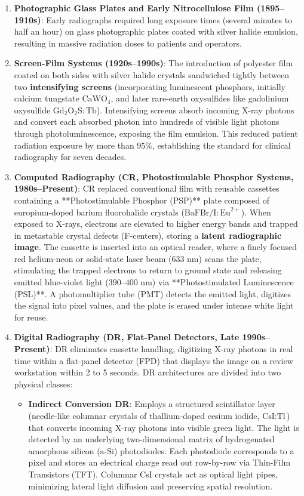 \documentclass[11pt,a4paper]{article}
\begin{document}
\begin{enumerate}[leftmargin=*]
    \item \textbf{Photographic Glass Plates and Early Nitrocellulose Film (1895--1910s)}: Early radiographs required long exposure times (several minutes to half an hour) on glass photographic plates coated with silver halide emulsion, resulting in massive radiation doses to patients and operators.
    \item \textbf{Screen-Film Systems (1920s--1990s)}: The introduction of polyester film coated on both sides with silver halide crystals sandwiched tightly between two \textbf{intensifying screens} (incorporating luminescent phosphors, initially calcium tungstate $\text{CaWO}_4$, and later rare-earth oxysulfides like gadolinium oxysulfide $\text{Gd}_2\text{O}_2\text{S}:\text{Tb}$). Intensifying screens absorb incoming X-ray photons and convert each absorbed photon into hundreds of visible light photons through photoluminescence, exposing the film emulsion. This reduced patient radiation exposure by more than $95\%$, establishing the standard for clinical radiography for seven decades.
    \item \textbf{Computed Radiography (CR, Photostimulable Phosphor Systems, 1980s--Present)}: CR replaced conventional film with reusable cassettes containing a **Photostimulable Phosphor (PSP)** plate composed of europium-doped barium fluorohalide crystals ($\text{BaFBr/I}:\text{Eu}^{2+}$). When exposed to X-rays, electrons are elevated to higher energy bands and trapped in metastable crystal defects (F-centers), storing a \textbf{latent radiographic image}. The cassette is inserted into an optical reader, where a finely focused red helium-neon or solid-state laser beam ($633\text{ nm}$) scans the plate, stimulating the trapped electrons to return to ground state and releasing emitted blue-violet light ($390\text{--}400\text{ nm}$) via **Photostimulated Luminescence (PSL)**. A photomultiplier tube (PMT) detects the emitted light, digitizes the signal into pixel values, and the plate is erased under intense white light for reuse.
    \item \textbf{Digital Radiography (DR, Flat-Panel Detectors, Late 1990s--Present)}: DR eliminates cassette handling, digitizing X-ray photons in real time within a flat-panel detector (FPD) that displays the image on a review workstation within 2 to 5 seconds. DR architectures are divided into two physical classes:
    \begin{itemize}
        \item \textbf{Indirect Conversion DR}: Employs a structured scintillator layer (needle-like columnar crystals of thallium-doped cesium iodide, $\text{CsI}:\text{Tl}$) that converts incoming X-ray photons into visible green light. The light is detected by an underlying two-dimensional matrix of hydrogenated amorphous silicon ($\text{a-Si}$) photodiodes. Each photodiode corresponds to a pixel and stores an electrical charge read out row-by-row via Thin-Film Transistors (TFT). Columnar CsI crystals act as optical light pipes, minimizing lateral light diffusion and preserving spatial resolution.

\end{itemize}
\end{enumerate}
\end{document}
